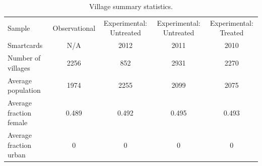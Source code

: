 \begin{table}

\caption{\label{tab:summaries}Village summary statistics.}
\centering
\begin{tabular}[t]{lcccc}
\toprule
Sample & Observational & Experimental: Untreated & Experimental: Untreated & Experimental: Treated\\
Smartcards & N/A & 2012 & 2011 & 2010\\
\midrule
Number of villages & 2256 & 852 & 2931 & 2270\\
Average population & 1974 & 2255 & 2099 & 2075\\
Average fraction female & 0.489 & 0.492 & 0.495 & 0.493\\
Average fraction urban & 0 & 0 & 0 & 0\\
\bottomrule
\end{tabular}
\end{table}
